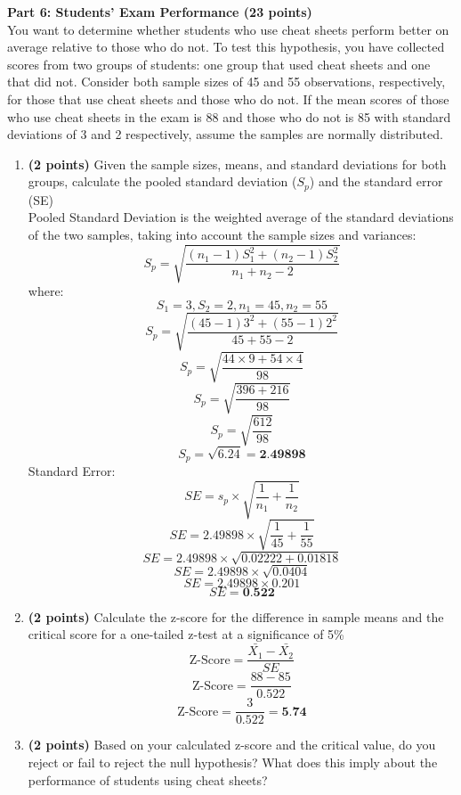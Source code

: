 \documentclass[a3paper,12pt]{extarticle} %
\begin{document}
    \subitem \textbf{Part 6: Students’ Exam Performance (23 points)}
   \\ You want to determine whether students who use cheat sheets perform better on average relative to
those who do not. To test this hypothesis, you have collected scores from two groups of students: one
group that used cheat sheets and one that did not. Consider both sample sizes of 45 and 55 observations,
respectively, for those that use cheat sheets and those who do not. If the mean scores of those who use
cheat sheets in the exam is 88 and those who do not is 85 with standard deviations of 3 and 2 respectively,
assume the samples are normally distributed.
\begin{enumerate}
    \item \textbf{(2 points)} Given the sample sizes, means, and standard deviations for both groups, calculate the
    pooled standard deviation (\(S_p\)) and the standard error (SE)
    \\ Pooled Standard Deviation is the weighted average of the standard deviations of the two samples, taking into account the sample sizes and variances:
    \[
    S_p = \sqrt{\frac{(n_1 - 1)S_1^2 + (n_2 - 1)S_2^2}{n_1 + n_2 - 2}}
    \]
    where:
    \[
    S_1 = 3, S_2 = 2, n_1 = 45, n_2 = 55
    \]
    \[
    S_p = \sqrt{\frac{(45 - 1)3^2 + (55 - 1)2^2}{45 + 55 - 2}}
    \]
    \[
    S_p = \sqrt{\frac{44 \times 9 + 54 \times 4}{98}}
    \]
    \[
    S_p = \sqrt{\frac{396 + 216}{98}}
    \]
    \[
    S_p = \sqrt{\frac{612}{98}}
    \]
    \[
    S_p = \sqrt{6.24} = \textbf{2.49898}
    \]
    Standard Error:
    \[
    SE = s_p \times \sqrt{\frac{1}{n_1} + \frac{1}{n_2}}
    \]
    \[
    SE = 2.49898 \times \sqrt{\frac{1}{45} + \frac{1}{55}}
    \]
    \[
    SE = 2.49898 \times \sqrt{0.02222 + 0.01818}
    \]
    \[
    SE = 2.49898 \times \sqrt{0.0404}
    \]
    \[
    SE = 2.49898 \times 0.201
    \]
    \[
    SE = \textbf{0.522}
    \]
    \item \textbf{(2 points)} Calculate the z-score for the difference in sample means and the critical score for a
    one-tailed z-test at a significance of 5\%
    \[
    \text{Z-Score} = \frac{\bar{X_1} - \bar{X_2}}{SE}
    \]
    \[
    \text{Z-Score} = \frac{88 - 85}{0.522}
    \]
    \[
    \text{Z-Score} = \frac{3}{0.522} = \textbf{5.74}
    \]
    \item \textbf{(2 points)} Based on your calculated z-score and the critical value, do you reject or fail to reject
    the null hypothesis? What does this imply about the performance of students using cheat sheets?

\end{enumerate}
\end{document}
